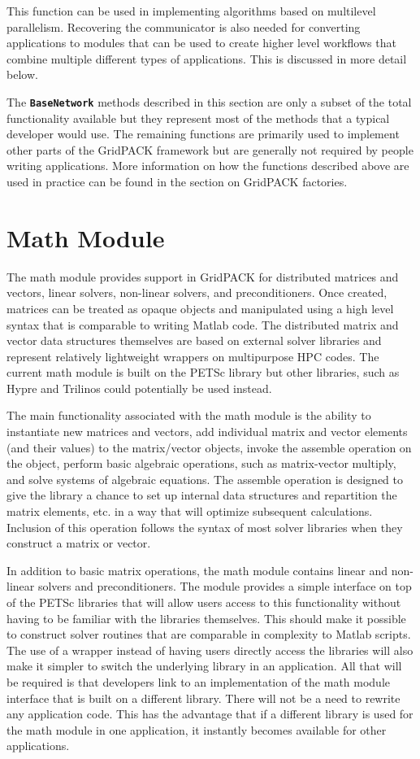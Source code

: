 \documentclass[12pt]{report} %
\begin{document}
This function can be used in implementing algorithms based on multilevel parallelism. Recovering the communicator is also needed for converting applications to modules that can be used to create higher level workflows that combine multiple different types of applications. This is discussed in more detail below.

The \texttt{\textbf{BaseNetwork}} methods described in this section are only a subset of the total functionality available but they represent most of the methods that a typical developer would use. The remaining functions are primarily used to implement other parts of the GridPACK framework but are generally not required by people writing applications. More information on how the functions described above are used in practice can be found in the section on GridPACK factories.

\section{Math Module}

The math module provides support in GridPACK for distributed matrices and vectors, linear solvers, non-linear solvers, and preconditioners. Once created, matrices can be treated as opaque objects and manipulated using a high level syntax that is comparable to writing Matlab code. The distributed matrix and vector data structures themselves are based on external solver libraries and represent relatively lightweight wrappers on multipurpose HPC codes. The current math module is built on the PETSc library but other libraries, such as Hypre and Trilinos could potentially be used instead.

The main functionality associated with the math module is the ability to instantiate new matrices and vectors, add individual matrix and vector elements (and their values) to the matrix/vector objects, invoke the assemble operation on the object, perform basic algebraic operations, such as matrix-vector multiply, and solve systems of algebraic equations. The assemble operation is designed to give the library a chance to set up internal data structures and repartition the matrix elements, etc. in a way that will optimize subsequent calculations. Inclusion of this operation follows the syntax of most solver libraries when they construct a matrix or vector. 

In addition to basic matrix operations, the math module contains linear and non-linear solvers and preconditioners. The module provides a simple interface on top of the PETSc libraries that will allow users access to this functionality without having to be familiar with the libraries themselves. This should make it possible to construct solver routines that are comparable in complexity to Matlab scripts. The use of a wrapper instead of having users directly access the libraries will also make it simpler to switch the underlying library in an application. All that will be required is that developers link to an implementation of the math module interface that is built on a different library. There will not be a need to rewrite any application code. This has the advantage that if a different library is used for the math module in one application, it instantly becomes available for other applications.
\end{document}
